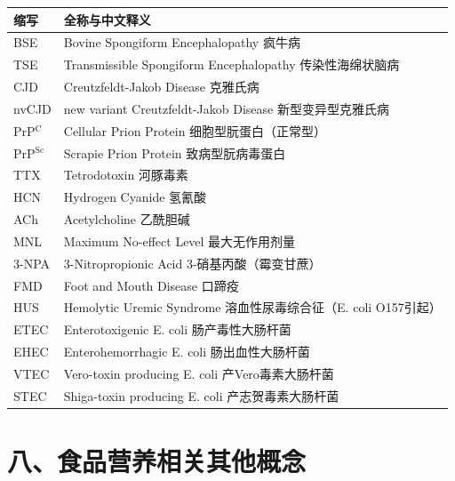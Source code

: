 \begin{table}[H]
\centering
\begin{tabularx}{\textwidth}{lX}
\toprule
\textbf{缩写} & \textbf{全称与中文释义} \\
\midrule
BSE & Bovine Spongiform Encephalopathy \hfill 疯牛病 \\
TSE & Transmissible Spongiform Encephalopathy \hfill 传染性海绵状脑病 \\
CJD & Creutzfeldt-Jakob Disease \hfill 克雅氏病 \\
nvCJD & new variant Creutzfeldt-Jakob Disease \hfill 新型变异型克雅氏病 \\
PrP$^\text{C}$ & Cellular Prion Protein \hfill 细胞型朊蛋白（正常型） \\
PrP$^\text{Sc}$ & Scrapie Prion Protein \hfill 致病型朊病毒蛋白 \\
TTX & Tetrodotoxin \hfill 河豚毒素 \\
HCN & Hydrogen Cyanide \hfill 氢氰酸 \\
ACh & Acetylcholine \hfill 乙酰胆碱 \\
MNL & Maximum No-effect Level \hfill 最大无作用剂量 \\
3-NPA & 3-Nitropropionic Acid \hfill 3-硝基丙酸（霉变甘蔗） \\
FMD & Foot and Mouth Disease \hfill 口蹄疫 \\
HUS & Hemolytic Uremic Syndrome \hfill 溶血性尿毒综合征（E. coli O157引起） \\
ETEC & Enterotoxigenic E. coli \hfill 肠产毒性大肠杆菌 \\
EHEC & Enterohemorrhagic E. coli \hfill 肠出血性大肠杆菌 \\
VTEC & Vero-toxin producing E. coli \hfill 产Vero毒素大肠杆菌 \\
STEC & Shiga-toxin producing E. coli \hfill 产志贺毒素大肠杆菌 \\
\bottomrule
\end{tabularx}
\end{table}

\section{八、食品营养相关其他概念}

